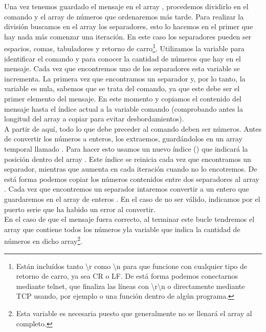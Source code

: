 
Una vez tenemos guardado el mensaje en el array , procedemos dividirlo en el comando y el array de números que ordenaremos más tarde. Para realizar la división buscamos en el array los separadores, esto lo hacemos en el primer  que hay nada más comenzar una iteración. En este caso los separadores pueden ser espacios, comas, tabuladores y retorno de carro\protect\footnote{Están incluídos tanto \textbackslash r como \textbackslash n para que funcione con cualquier tipo de retorno de carro, ya sea CR o LF. De está forma podemos conectarnos mediante telnet, que finaliza las líneas con \textbackslash r\textbackslash n o directamente mediante TCP usando, por ejemplo  o una función dentro de algún programa.}. Utilizamos la variable  para identificar el comando y para conocer la cantidad de números que hay en el mensaje. Cada vez que encontremos uno de los separadores esta variable se incrementa. La primera vez que encontramos un separador y, por lo tanto, la variable  es nula, sabemos que se trata del comando, ya que este debe ser el primer elemento del mensaje. En este momento y copiamos el contenido del mensaje hasta el índice actual a la variable comando (comprobando antes la longitud del array a copiar para evitar desbordamientos).\\
A partir de aquí, todo lo que debe preceder al comando deben ser números. Antes de convertir los números a enteros, los extraemos, guardándolos en un array temporal llamado . Para hacer esto usamos un nuevo índice () que indicará la posición dentro del array . Este índice se reinicia cada vez que encontramos un separador, mientras que aumenta en cada iteración cuando no lo encotremos. De está forma podemos copiar los números contenidos entre dos separadores al array . Cada vez que encontremos un separador intaremos convertir  a un entero que guardaremos en el array de enteros . En el caso de no ser válido, indicamos por el puerto serie que ha habido un error al convertir.\\
En el caso de que el mensaje fuera correcto, al terminar este bucle tendremos el array  que contiene todos los números yla variable  que indica la cantidad de números en dicho array\protect\footnote{Esta variable es necesaria puesto que generalmente no se llenará el array al completo.}. 

